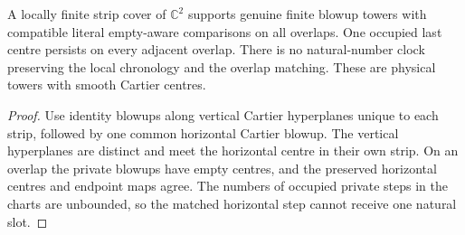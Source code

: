 \begin{theorem}
\label{hir:g8-cartier-strip-clock-obstruction}
\leanok
A locally finite strip cover of $\mathbb C^2$ supports genuine finite
blowup towers with compatible literal empty-aware comparisons on
all overlaps. One occupied last centre persists on every
adjacent overlap. There is no natural-number clock preserving
the local chronology and the overlap matching. These are
physical towers with smooth Cartier centres.
\end{theorem}
\begin{proof}
Use identity blowups along vertical Cartier hyperplanes unique to
each strip, followed by one common horizontal Cartier blowup.
The vertical hyperplanes are distinct and meet the horizontal
centre in their own strip. On an overlap the private blowups
have empty centres, and the preserved horizontal centres and
endpoint maps agree. The numbers of occupied private steps in
the charts are unbounded, so the matched horizontal step cannot
receive one natural slot.
\end{proof}

